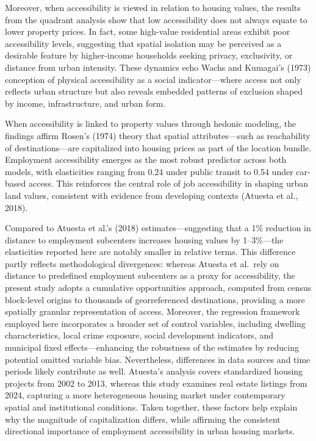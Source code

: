 \documentclass[
  12pt,
]{report}
\begin{document}
Moreover, when accessibility is viewed in relation to housing values,
the results from the quadrant analysis show that low accessibility does
not always equate to lower property prices. In fact, some high-value
residential areas exhibit poor accessibility levels, suggesting that
spatial isolation may be perceived as a desirable feature by
higher-income households seeking privacy, exclusivity, or distance from
urban intensity. These dynamics echo Wachs and Kumagai's (1973)
conception of physical accessibility as a social indicator---where
access not only reflects urban structure but also reveals embedded
patterns of exclusion shaped by income, infrastructure, and urban form.

When accessibility is linked to property values through hedonic
modeling, the findings affirm Rosen's (1974) theory that spatial
attributes---such as reachability of destinations---are capitalized into
housing prices as part of the location bundle. Employment accessibility
emerges as the most robust predictor across both models, with
elasticities ranging from 0.24 under public transit to 0.54 under
car-based access. This reinforces the central role of job accessibility
in shaping urban land values, consistent with evidence from developing
contexts (Atuesta et al., 2018).

Compared to Atuesta et al.'s (2018) estimates---suggesting that a 1\%
reduction in distance to employment subcenters increases housing values
by 1--3\%---the elasticities reported here are notably smaller in
relative terms. This difference partly reflects methodological
divergences: whereas Atuesta et al.~rely on distance to predefined
employment subcenters as a proxy for accessibility, the present study
adopts a cumulative opportunities approach, computed from census
block-level origins to thousands of georreferenced destinations,
providing a more spatially granular representation of access. Moreover,
the regression framework employed here incorporates a broader set of
control variables, including dwelling characteristics, local crime
exposure, social development indicators, and municipal fixed
effects---enhancing the robustness of the estimates by reducing
potential omitted variable bias. Nevertheless, differences in data
sources and time periods likely contribute as well. Atuesta's analysis
covers standardized housing projects from 2002 to 2013, whereas this
study examines real estate listings from 2024, capturing a more
heterogeneous housing market under contemporary spatial and
institutional conditions. Taken together, these factors help explain why
the magnitude of capitalization differs, while affirming the consistent
directional importance of employment accessibility in urban housing
markets.
\end{document}
